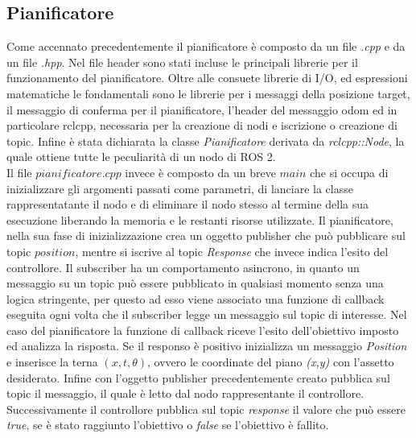 \documentclass[a4paper,11 pt,oneside]{book}
\theoremstyle{definition}
\begin{document}
\subsection{Pianificatore}
Come accennato precedentemente il pianificatore è composto da un file \emph{.cpp} e da un file \emph{.hpp}. Nel file header sono stati incluse le principali librerie per il funzionamento del pianificatore.
Oltre alle consuete librerie di I/O, ed espressioni matematiche le fondamentali sono le librerie per i messaggi della posizione target, il messaggio di conferma per il pianificatore, l'header del messaggio odom ed in particolare rclcpp, necessaria per la creazione di nodi e iscrizione o creazione di topic.
Infine è stata dichiarata la classe \emph{Pianificatore} derivata da \emph{rclcpp::Node}, la quale ottiene tutte le peculiarità di un nodo di ROS 2.
\\
Il file $pianificatore.cpp$ invece è composto da un breve $main$ che si occupa di inizializzare gli argomenti passati come parametri, di lanciare la classe rappresentatante il nodo e di eliminare il nodo stesso al termine della sua esecuzione liberando la memoria e le restanti risorse utilizzate.
Il pianificatore, nella sua fase di inizializzazione crea un oggetto publisher che può pubblicare sul topic $position$, mentre si iscrive al topic \emph{Response} che invece indica l'esito del controllore. Il subscriber ha un comportamento asincrono, in quanto un messaggio su un topic può essere pubblicato in qualsiasi momento senza una logica stringente, per questo ad esso viene associato una funzione di callback eseguita ogni volta che il subscriber legge un messaggio sul topic di interesse. Nel caso del pianificatore la funzione di callback riceve l'esito dell'obiettivo imposto ed analizza la risposta. Se il responso è positivo inizializza un messaggio \emph{Position} e inserisce la terna $(x,t, \theta)$, ovvero le coordinate del piano \emph{(x,y)} con l'assetto desiderato.
Infine con l'oggetto publisher precedentemente creato pubblica sul topic il messaggio, il quale è letto dal nodo rappresentante il  controllore. Successivamente il controllore pubblica sul topic \emph{response} il valore che può essere \emph{true}, se è stato raggiunto l'obiettivo o \emph{false} se l'obiettivo è fallito.
\end{document}

